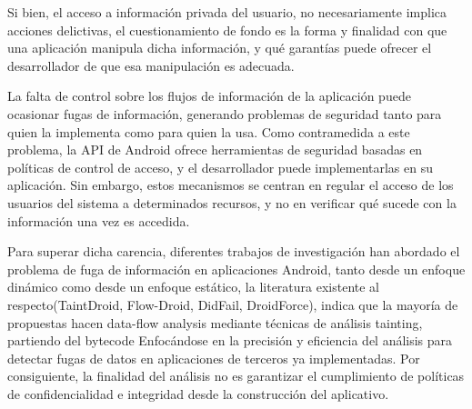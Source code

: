 Si bien, el acceso a información privada del usuario, no necesariamente
implica acciones delictivas, el cuestionamiento de
fondo es la forma y finalidad con que una aplicación manipula dicha información,
y qué garantías puede ofrecer el desarrollador de que esa manipulación es
adecuada.

La falta de control sobre los flujos de información de la aplicación puede
ocasionar fugas de información, generando problemas de seguridad tanto para
quien la implementa como para quien la usa.\newline
Como contramedida a este problema, la API de Android ofrece herramientas de
seguridad basadas en políticas de control de acceso, y el desarrollador puede
implementarlas en su aplicación. Sin embargo, estos mecanismos se centran en
regular el acceso de los usuarios del sistema a determinados recursos, y no en
verificar qué sucede con la información una vez es accedida. 

Para superar dicha carencia, diferentes trabajos de investigación han abordado
el problema de fuga de información en aplicaciones Android, tanto desde un enfoque
dinámico como desde un enfoque estático, la literatura existente al
respecto(TaintDroid\cite{TaintDroid}, Flow-Droid\cite{FlowDroid-Thesis},
DidFail\cite{DidFail}, DroidForce\cite{DroidForce}), indica que la mayoría de
propuestas hacen data-flow analysis mediante técnicas de análisis 
tainting, partiendo del bytecode
Enfocándose en la precisión y eficiencia del análisis para detectar fugas de
datos en aplicaciones de terceros ya implementadas. Por consiguiente,
la finalidad del análisis no es garantizar el cumplimiento de políticas de
confidencialidad e integridad desde la construcción del aplicativo.

